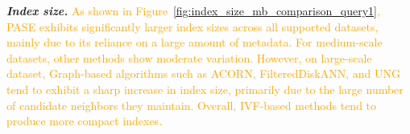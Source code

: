 \documentclass[sigconf, nonacm]{acmart}
\begin{document}
{%
%
%
%


\textit{\textbf{Index size.}}
\textcolor{orange}{
	As shown in Figure~\ref{fig:index_size_mb_comparison_query1}, PASE exhibits significantly larger index sizes across all supported datasets, mainly due to its reliance on a large amount of metadata. For medium-scale datasets, other methods show moderate variation. However, on large-scale dataset, Graph-based algorithms such as ACORN, FilteredDiskANN, and UNG tend to exhibit a sharp increase in index size, primarily due to the large number of candidate neighbors they maintain. Overall, IVF-based methods tend to produce more compact indexes.
}



}
\end{document}
